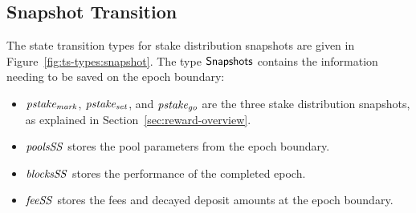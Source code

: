 \clearpage

\subsection{Snapshot Transition}
\label{sec:snapshots}

The state transition types for stake distribution snapshots are given in
Figure~\ref{fig:ts-types:snapshot}.
The type $\mathsf{\mathsf{Snapshots}}$ contains the information needing to be saved on the epoch boundary:
\begin{itemize}
  \item $\mathit{pstake_{mark}}$, $\mathit{pstake_{set}}$, and $\mathit{pstake_{go}}$ are the three
    stake distribution snapshots, as explained in Section~\ref{sec:reward-overview}.
  \item $\mathit{poolsSS}$ stores the pool parameters from the epoch boundary.
  \item $\mathit{blocksSS}$ stores the performance of the completed epoch.
  \item $\mathit{feeSS}$ stores the fees and decayed deposit amounts at the epoch boundary.
\end{itemize}

